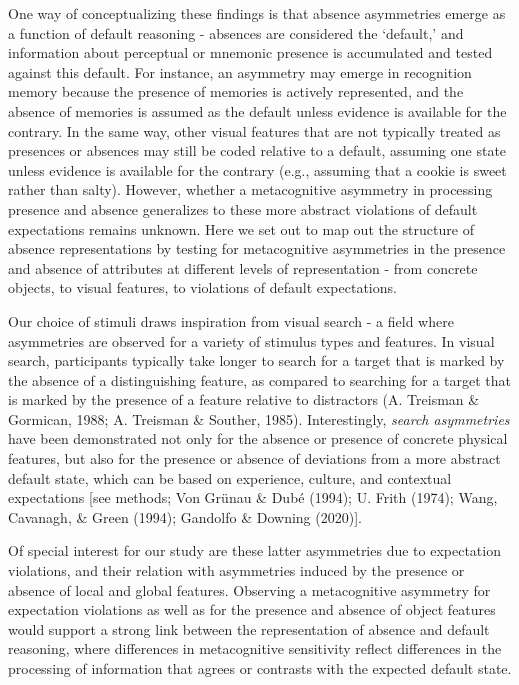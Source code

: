 \documentclass[12pt,twoside]{reedthesis}
\begin{document}
One way of conceptualizing these findings is that absence asymmetries emerge as a function of default reasoning - absences are considered the `default,' and information about perceptual or mnemonic presence is accumulated and tested against this default. For instance, an asymmetry may emerge in recognition memory because the presence of memories is actively represented, and the absence of memories is assumed as the default unless evidence is available for the contrary. In the same way, other visual features that are not typically treated as presences or absences may still be coded relative to a default, assuming one state unless evidence is available for the contrary (e.g., assuming that a cookie is sweet rather than salty). However, whether a metacognitive asymmetry in processing presence and absence generalizes to these more abstract violations of default expectations remains unknown. Here we set out to map out the structure of absence representations by testing for metacognitive asymmetries in the presence and absence of attributes at different levels of representation - from concrete objects, to visual features, to violations of default expectations.

Our choice of stimuli draws inspiration from visual search - a field where asymmetries are observed for a variety of stimulus types and features. In visual search, participants typically take longer to search for a target that is marked by the absence of a distinguishing feature, as compared to searching for a target that is marked by the presence of a feature relative to distractors (A. Treisman \& Gormican, 1988; A. Treisman \& Souther, 1985). Interestingly, \emph{search asymmetries} have been demonstrated not only for the absence or presence of concrete physical features, but also for the presence or absence of deviations from a more abstract default state, which can be based on experience, culture, and contextual expectations {[}see methods; Von Grünau \& Dubé (1994); U. Frith (1974); Wang, Cavanagh, \& Green (1994); Gandolfo \& Downing (2020){]}.

Of special interest for our study are these latter asymmetries due to expectation violations, and their relation with asymmetries induced by the presence or absence of local and global features. Observing a metacognitive asymmetry for expectation violations as well as for the presence and absence of object features would support a strong link between the representation of absence and default reasoning, where differences in metacognitive sensitivity reflect differences in the processing of information that agrees or contrasts with the expected default state.
\end{document}
